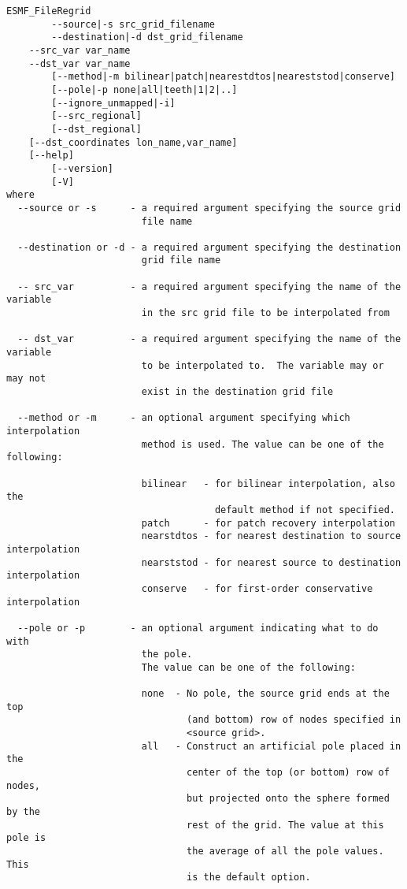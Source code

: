 \begin{verbatim}
ESMF_FileRegrid  
        --source|-s src_grid_filename
        --destination|-d dst_grid_filename
	--src_var var_name
	--dst_var var_name
        [--method|-m bilinear|patch|nearestdtos|neareststod|conserve]
        [--pole|-p none|all|teeth|1|2|..]
        [--ignore_unmapped|-i]
        [--src_regional]
        [--dst_regional]
	[--dst_coordinates lon_name,var_name]
	[--help]
        [--version]
        [-V]
where
  --source or -s      - a required argument specifying the source grid
                        file name

  --destination or -d - a required argument specifying the destination
                        grid file name

  -- src_var          - a required argument specifying the name of the variable 
                        in the src grid file to be interpolated from

  -- dst_var          - a required argument specifying the name of the variable 
                        to be interpolated to.  The variable may or may not 
                        exist in the destination grid file

  --method or -m      - an optional argument specifying which interpolation
                        method is used. The value can be one of the following:

                        bilinear   - for bilinear interpolation, also the
                                     default method if not specified.
                        patch      - for patch recovery interpolation
                        nearstdtos - for nearest destination to source interpolation
                        nearststod - for nearest source to destination interpolation
                        conserve   - for first-order conservative interpolation

  --pole or -p        - an optional argument indicating what to do with
                        the pole.
                        The value can be one of the following:

                        none  - No pole, the source grid ends at the top
                                (and bottom) row of nodes specified in
                                <source grid>.
                        all   - Construct an artificial pole placed in the
                                center of the top (or bottom) row of nodes,
                                but projected onto the sphere formed by the
                                rest of the grid. The value at this pole is
                                the average of all the pole values. This
                                is the default option.


\end{verbatim}
